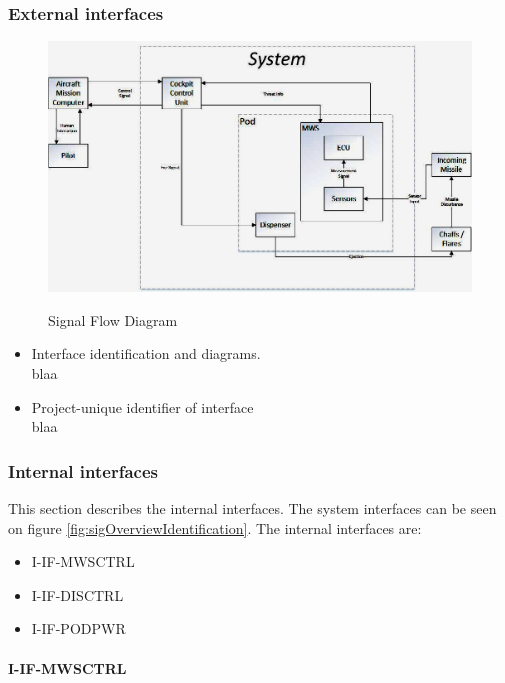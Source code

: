 \subsubsection{External interfaces}

\begin{figure}[h]
	\centering
	\includegraphics[scale=0.5]{./images/SignalFlowDiagram}\\
	\caption{Signal Flow Diagram}
    \label{fig:sigFlowDiagram}
\end{figure}
\begin{itemize}
\item {Interface identification and diagrams.}\\
blaa
\item {Project-unique identifier of interface}\\
blaa
\end{itemize}

\subsubsection{Internal interfaces}
This section describes the internal interfaces. The system interfaces can be seen on figure \ref{fig:sigOverviewIdentification}. The internal interfaces are:

\begin{itemize}
\item I-IF-MWSCTRL
\item I-IF-DISCTRL
\item I-IF-PODPWR
\end{itemize}

\paragraph{I-IF-MWSCTRL}

